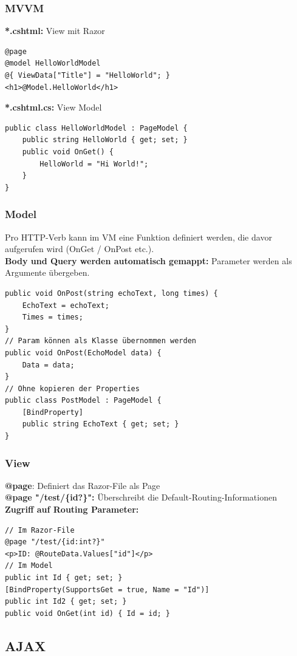 \subsubsection{MVVM}
\textbf{*.cshtml:} View mit Razor
\begin{lstlisting}
@page
@model HelloWorldModel
@{ ViewData["Title"] = "HelloWorld"; }
<h1>@Model.HelloWorld</h1>
\end{lstlisting}
\textbf{*.cshtml.cs:} View Model
\begin{lstlisting}
public class HelloWorldModel : PageModel {
    public string HelloWorld { get; set; }
    public void OnGet() {
        HelloWorld = "Hi World!";
    }
}
\end{lstlisting}

\subsubsection{Model}
Pro HTTP-Verb kann im VM eine Funktion definiert werden, die davor aufgerufen wird (OnGet / OnPost etc.).\\
\textbf{Body und Query werden automatisch gemappt:} Parameter werden als Argumente übergeben.
\begin{lstlisting}
public void OnPost(string echoText, long times) {
    EchoText = echoText;
    Times = times;
}
// Param können als Klasse übernommen werden
public void OnPost(EchoModel data) {
    Data = data;
}
// Ohne kopieren der Properties
public class PostModel : PageModel {
    [BindProperty]
    public string EchoText { get; set; }
}
\end{lstlisting}

\subsubsection{View}
\textbf{@page}: Definiert das Razor-File als Page\\
\textbf{@page "/test/\{id?\}":} Überschreibt die Default-Routing-Informationen\\
\textbf{Zugriff auf Routing Parameter:}
\begin{lstlisting}
// Im Razor-File
@page "/test/{id:int?}"
<p>ID: @RouteData.Values["id"]</p>
// Im Model
public int Id { get; set; }
[BindProperty(SupportsGet = true, Name = "Id")]
public int Id2 { get; set; }
public void OnGet(int id) { Id = id; }
\end{lstlisting}

\subsection{AJAX}
